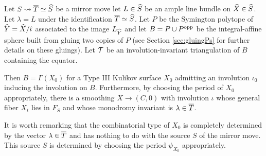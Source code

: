 \documentclass{amsart}
\begin{document}
\begin{theorem}\label{smoothable} Let $S\leadsto {\overline T} \simeq {\widehat S}$ be a mirror move
let $L\in {\widehat S}$ be an ample line bundle on ${\widehat X}\in{\widehat S}$. Let $\lambda = L$
under the identification ${\overline T}\simeq {\widehat S}$. Let $P$ be the Symington polytope
of ${\widehat Y} = {\widehat X}/\hat{\iota}$ associated to the image $L_{\widehat Y}$ 
and let $B= P\cup P^{\rm opp}$ be the integral-affine sphere built from
gluing two copies of $P$ (see Section \ref{sec:gluingPs} for further
details on these gluings). Let ${\mathcal T}$ be an involution-invariant
triangulation of $B$ containing the equator.

Then $B=\Gamma(X_0)$
for a Type III Kulikov surface $X_0$ admitting an involution $\iota_0$
inducing the involution on $B$.
Furthermore, by choosing the period of $X_0$
appropriately, there is a smoothing $X\to (C,0)$ with involution $\iota$
whose general fiber
$X_t$ lies in $F_S$ and whose monodromy invariant is $\lambda\in {\overline T}$.
  \end{theorem}
  
  It is worth remarking that the combinatorial type of $X_0$
  is completely determined by the vector $\lambda\in {\overline T}$
  and has nothing to do with the source $S$ of the mirror move.
  This source $S$ is determined by choosing the period $\psi_{X_0}$ appropriately.
  
\end{document}
